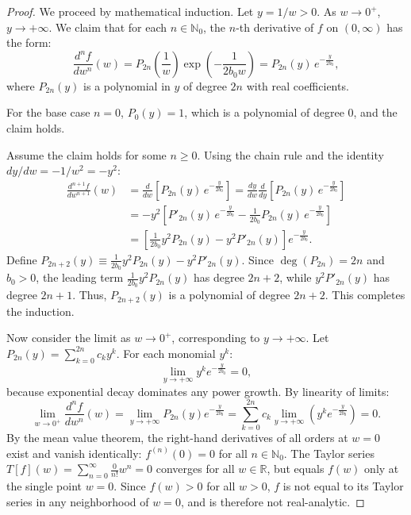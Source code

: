\begin{proof}
We proceed by mathematical induction. Let $y = 1/w > 0$. As $w \to 0^+$, $y \to +\infty$. We claim that for each $n \in \mathbb{N}_0$, the $n$-th derivative of $f$ on $(0, \infty)$ has the form:
\begin{equation}
\label{eq:induction_hypothesis}
\frac{d^n f}{dw^n}(w) = P_{2n}\left( \frac{1}{w} \right) \exp\left( -\frac{1}{2 b_0 w} \right) = P_{2n}(y) \, e^{-\frac{y}{2b_0}},
\end{equation}
where $P_{2n}(y)$ is a polynomial in $y$ of degree $2n$ with real coefficients.

For the base case $n = 0$, $P_0(y) = 1$, which is a polynomial of degree 0, and the claim holds.

Assume the claim holds for some $n \ge 0$. Using the chain rule and the identity $dy/dw = -1/w^2 = -y^2$:
\begin{align}
\frac{d^{n+1} f}{dw^{n+1}}(w) &= \frac{d}{dw} \left[ P_{2n}(y) \, e^{-\frac{y}{2b_0}} \right] = \frac{dy}{dw} \frac{d}{dy} \left[ P_{2n}(y) \, e^{-\frac{y}{2b_0}} \right] \nonumber \\
&= -y^2 \left[ P'_{2n}(y) \, e^{-\frac{y}{2b_0}} - \frac{1}{2b_0} P_{2n}(y) \, e^{-\frac{y}{2b_0}} \right] \nonumber \\
&= \left[ \frac{1}{2b_0} y^2 P_{2n}(y) - y^2 P'_{2n}(y) \right] e^{-\frac{y}{2b_0}}.
\end{align}
Define $P_{2n+2}(y) \equiv \frac{1}{2b_0} y^2 P_{2n}(y) - y^2 P'_{2n}(y)$. Since $\deg(P_{2n}) = 2n$ and $b_0 > 0$, the leading term $\frac{1}{2b_0} y^2 P_{2n}(y)$ has degree $2n+2$, while $y^2 P'_{2n}(y)$ has degree $2n+1$. Thus, $P_{2n+2}(y)$ is a polynomial of degree $2n+2$. This completes the induction.

Now consider the limit as $w \to 0^+$, corresponding to $y \to +\infty$. Let $P_{2n}(y) = \sum_{k=0}^{2n} c_k y^k$. For each monomial $y^k$:
\begin{equation}
\lim_{y \to +\infty} y^k e^{-\frac{y}{2b_0}} = 0,
\end{equation}
because exponential decay dominates any power growth. By linearity of limits:
\begin{equation}
\lim_{w \to 0^+} \frac{d^n f}{dw^n}(w) = \lim_{y \to +\infty} P_{2n}(y) e^{-\frac{y}{2b_0}} = \sum_{k=0}^{2n} c_k \lim_{y \to +\infty} \left( y^k e^{-\frac{y}{2b_0}} \right) = 0.
\end{equation}
By the mean value theorem, the right-hand derivatives of all orders at $w = 0$ exist and vanish identically: $f^{(n)}(0) = 0$ for all $n \in \mathbb{N}_0$. The Taylor series $T[f](w) = \sum_{n=0}^\infty \frac{0}{n!} w^n = 0$ converges for all $w \in \mathbb{R}$, but equals $f(w)$ only at the single point $w = 0$. Since $f(w) > 0$ for all $w > 0$, $f$ is not equal to its Taylor series in any neighborhood of $w = 0$, and is therefore not real-analytic.


\end{proof}
